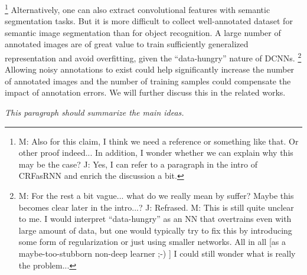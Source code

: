 \footnote{M: Also for this claim, I think we need a reference or something like that. Or other proof indeed...  In addition, I wonder whether we can explain why this may be the case? J: Yes, I can refer to a paragraph in the intro of CRFasRNN and enrich the discussion a bit.}
\noindent
Alternatively, one can also extract convolutional features with semantic segmentation tasks.
But it is more difficult to collect well-annotated dataset for semantic image segmentation than for object recognition.
A large number of annotated images are of great value to train sufficiently generalized representation and avoid overfitting, given the ``data-hungry'' nature of DCNNs.
\footnote{M: For the rest a bit vague... what do we really mean by suffer? Maybe this becomes clear later in the intro...? J: Refrased. M: This is still quite unclear to me.  I would interpret ``data-hungry'' as an NN that overtrains even with large amount of data, but one would typically try to fix this by introducing some form of regularization or just using smaller networks.  All in all [as a maybe-too-stubborn non-deep learner  ;-)  ] I could still wonder what is really the problem...}
Allowing noisy annotations to exist could help significantly increase the number of annotated images and the number of training samples could compensate the impact of annotation errors.
We will further discuss this in the related works.

\noindent
\textit{This paragraph should summarize the main ideas.}

